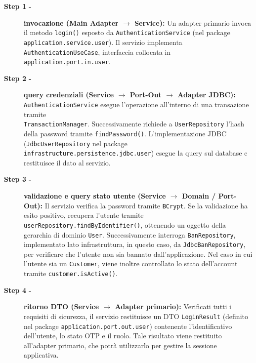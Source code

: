 \documentclass[a4paper,11pt]{article}
\begin{document}
\begin{description}
	\item[\textbf{Step 1 -}] \textbf{invocazione (Main Adapter $\rightarrow$ Service):} 
	Un adapter primario invoca il metodo \texttt{login()} esposto da \texttt{AuthenticationService} (nel package \texttt{application.service.user}). Il servizio implementa \texttt{AuthenticationUseCase}, interfaccia collocata in \\ \texttt{application.port.in.user}.
	
	\item[\textbf{Step 2 -}] \textbf{query credenziali (Service $\rightarrow$ Port-Out $\rightarrow$ Adapter JDBC):} 
	\\ \texttt{AuthenticationService} esegue l'operazione all'interno di una transazione tramite \\ \texttt{TransactionManager}. Successivamente richiede a \texttt{UserRepository} l'hash della password tramite \texttt{findPassword()}. L'implementazione JDBC (\texttt{JdbcUserRepository} nel package \texttt{infrastructure.persistence.jdbc.user}) esegue la query sul database e restituisce il dato al servizio.
	
	\item[\textbf{Step 3 -}] \textbf{validazione e query stato utente (Service $\rightarrow$ Domain / Port-Out):} 
	Il servizio verifica la password tramite \texttt{BCrypt}. Se la validazione ha esito positivo, recupera l'utente tramite \texttt{userRepository.findByIdentifier()}, ottenendo un oggetto della gerarchia di dominio \texttt{User}. Successivamente interroga \texttt{BanRepository}, implementato lato infrastruttura, in questo caso, da \texttt{JdbcBanRepository}, per verificare che l'utente non sia bannato dall'applicazione. Nel caso in cui l'utente sia un \texttt{Customer}, viene inoltre controllato lo stato dell'account tramite \texttt{customer.isActive()}.
	
	\item[\textbf{Step 4 -}] \textbf{ritorno DTO (Service $\rightarrow$ Adapter primario):} 
	Verificati tutti i requisiti di sicurezza, il servizio restituisce un DTO \texttt{LoginResult} (definito nel package \texttt{application.port.out.user}) contenente l'identificativo dell'utente, lo stato OTP e il ruolo. Tale risultato viene restituito all'adapter primario, che potrà utilizzarlo per gestire la sessione applicativa.
\end{description}

\newpage
\end{document}
